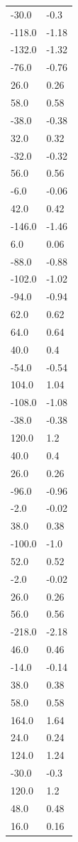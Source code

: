 \begin{longtable}{ll}
-30.0 & -0.3 \\
-118.0 & -1.18 \\
-132.0 & -1.32 \\
-76.0 & -0.76 \\
26.0 & 0.26 \\
58.0 & 0.58 \\
-38.0 & -0.38 \\
32.0 & 0.32 \\
-32.0 & -0.32 \\
56.0 & 0.56 \\
-6.0 & -0.06 \\
42.0 & 0.42 \\
-146.0 & -1.46 \\
6.0 & 0.06 \\
-88.0 & -0.88 \\
-102.0 & -1.02 \\
-94.0 & -0.94 \\
62.0 & 0.62 \\
64.0 & 0.64 \\
40.0 & 0.4 \\
-54.0 & -0.54 \\
104.0 & 1.04 \\
-108.0 & -1.08 \\
-38.0 & -0.38 \\
120.0 & 1.2 \\
40.0 & 0.4 \\
26.0 & 0.26 \\
-96.0 & -0.96 \\
-2.0 & -0.02 \\
38.0 & 0.38 \\
-100.0 & -1.0 \\
52.0 & 0.52 \\
-2.0 & -0.02 \\
26.0 & 0.26 \\
56.0 & 0.56 \\
-218.0 & -2.18 \\
46.0 & 0.46 \\
-14.0 & -0.14 \\
38.0 & 0.38 \\
58.0 & 0.58 \\
164.0 & 1.64 \\
24.0 & 0.24 \\
124.0 & 1.24 \\
-30.0 & -0.3 \\
120.0 & 1.2 \\
48.0 & 0.48 \\
16.0 & 0.16 \\

\end{longtable}
